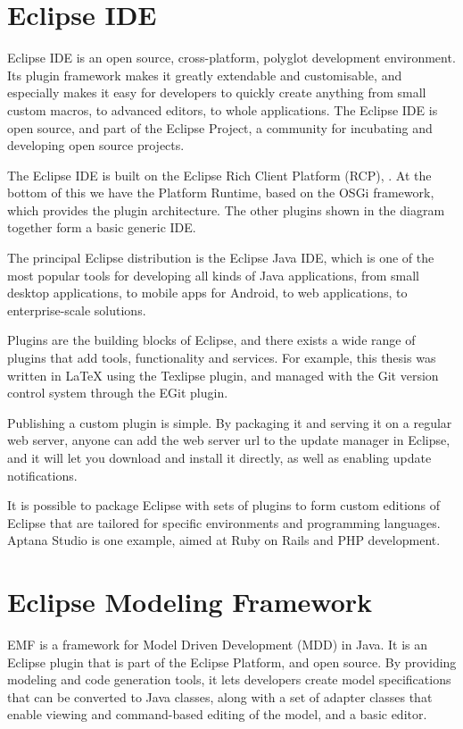 \section{Eclipse IDE}
Eclipse IDE is an open source, cross-platform, polyglot development environment.
Its plugin framework makes it greatly extendable and customisable, and especially makes it
easy for developers to quickly create anything from small custom macros, to
advanced editors, to whole applications. The Eclipse IDE is open source, and
part of the Eclipse Project, a community for incubating and developing open
source projects.


The Eclipse IDE is built on the Eclipse Rich Client Platform (RCP),
. At the bottom of this we have the Platform Runtime, based
on the OSGi framework, which provides the plugin architecture. The other
plugins shown in the diagram together form a basic generic IDE.

The principal Eclipse distribution is the Eclipse Java IDE, which is one of the
most popular tools for developing all kinds of Java applications, from small
desktop applications, to mobile apps for Android, to web applications, to
enterprise-scale solutions. 

Plugins are the building blocks of Eclipse, and there exists a wide range of
plugins that add tools, functionality and services. For example, this thesis
was written in \LaTeX{} using the Texlipse plugin, and managed with the Git
version control system through the EGit plugin. 

Publishing a custom plugin is simple. By packaging it and serving it on a
regular web server, anyone can add the web server url to the update manager in
Eclipse, and it will let you download and install it directly, as well as
enabling update notifications.

It is possible to package Eclipse with sets of
plugins to form custom editions of Eclipse that are tailored for specific
environments and programming languages. Aptana Studio is one example, aimed at
Ruby on Rails and PHP development.


\section{Eclipse Modeling Framework}
EMF is a framework for Model Driven Development (MDD) in Java. It is an Eclipse
plugin that is part of the Eclipse Platform, and open source. By providing
modeling and code generation tools, it lets developers create model
specifications that can be converted to Java classes, along with a
set of adapter classes that enable viewing and command-based editing of the
model, and a basic editor. 

